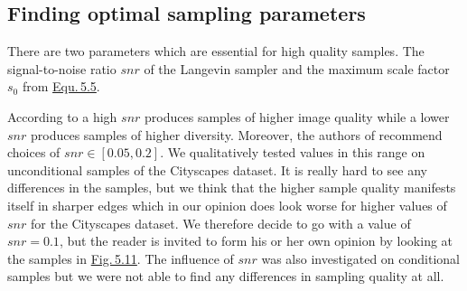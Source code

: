 \subsection{Finding optimal sampling parameters} \label{sec:5.4.4}

There are two parameters which are essential for high quality samples. The signal-to-noise ratio $snr$ of the Langevin sampler and the maximum scale factor $s_0$ from \hyperref[equ:5.5]{Equ.\,5.5}. 

According to \cite{score_1} a high $snr$ produces samples of higher image quality while a lower $snr$ produces samples of higher diversity. Moreover, the authors of \cite{score_1} recommend choices of $snr\in[0.05,0.2]$. We qualitatively tested values in this range on unconditional samples of the Cityscapes dataset. It is really hard to see any differences in the samples, but we think that the higher sample quality manifests itself in sharper edges which in our opinion does look worse for higher values of $snr$ for the Cityscapes dataset. We therefore decide to go with a value of $snr=0.1$, but the reader is invited to form his or her own opinion by looking at the samples in \hyperref[fig:5.11]{Fig.\,5.11}. The influence of $snr$ was also investigated on conditional samples but we were not able to find any differences in sampling quality at all.
%
